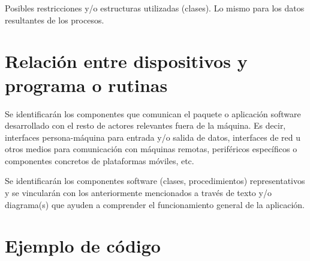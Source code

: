 \documentclass[12pt,a4paper,titlepage]{article}
\begin{document}
    Posibles restricciones y/o estructuras utilizadas (clases). Lo mismo para los datos resultantes de los procesos.

    \section{Relación entre dispositivos y programa o rutinas}

    Se identificarán los componentes que comunican el paquete o aplicación software desarrollado con el resto de actores relevantes fuera de la máquina. Es decir, interfaces persona-máquina para entrada y/o salida de datos, interfaces de red u otros medios para comunicación con máquinas remotas, periféricos específicos o componentes concretos de plataformas móviles, etc. 

    Se identificarán los componentes software (clases, procedimientos) representativos y se vincularán con los anteriormente mencionados a través de texto y/o diagrama(s) que ayuden a comprender el funcionamiento general de la aplicación.

    \section{Ejemplo de código}

    
\end{document}
